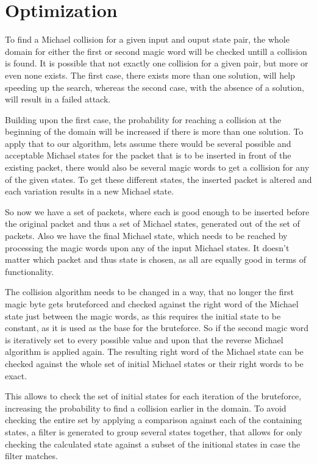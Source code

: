 \documentclass[a4paper,10pt]{scrartcl}
\begin{document}
\section{Optimization}
\label{sec:optimization}

To find a Michael collision for a given input and ouput state pair, the whole domain for either the first or second magic word will be
checked untill a collision is found. It is possible that not exactly one collision for a given pair, but more or even none exists.
The first case, there exists more than one solution, will help speeding up the search, whereas the second case, with the absence of a
solution, will result in a failed attack.

Building upon the first case, the probability for reaching a collision at the beginning of the domain will be increased if there is more
than one solution. To apply that to our algorithm, lets assume there would be several possible and acceptable Michael states for the packet
that is to be inserted in front of the existing packet, there would also be several magic words to get a collision for any of the given
states. To get these different states, the inserted packet is altered and each variation results in a new Michael state.

So now we have a set of packets, where each is good enough to be inserted before the original packet and thus a set of Michael states,
generated out of the set of packets. Also we have the final Michael state, which needs to be reached by processing the magic words
upon any of the input Michael states. It doesn't matter which packet and thus state is chosen, as all are equally good in terms of
functionality.

The collision algorithm needs to be changed in a way, that no longer the first magic byte gets bruteforced and checked against the
right word of the Michael state just between the magic words, as this requires the initial state to be constant, as it is used as the
base for the bruteforce. So if the second magic word is iteratively set to every possible value and upon that the reverse Michael
algorithm is applied again. The resulting right word of the Michael state can be checked against the whole set of initial Michael states
or their right words to be exact.

This allows to check the set of initial states for each iteration of the bruteforce, increasing the probability to find a collision
earlier in the domain. To avoid checking the entire set by applying a comparison against each of the containing states, a filter is
generated to group several states together, that allows for only checking the calculated state against a subset of the initional states
in case the filter matches.
\end{document}

